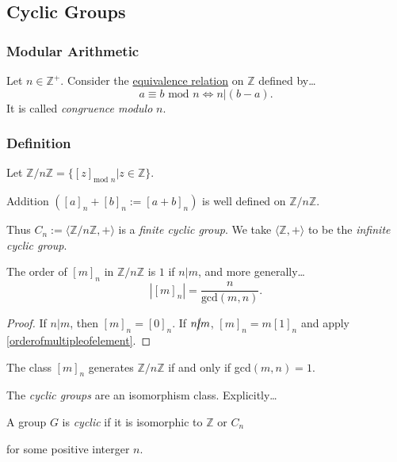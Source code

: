 \subsection{Cyclic Groups}\label{cyclicgroups}

\subsubsection{Modular Arithmetic}\label{modular arithmetic}
Let $n \in \mathbb{Z}^+$. Consider the \hyperref[equivalencerelation]{equivalence relation} on $\mathbb{Z}$ defined by\dots
$$a \equiv b \textrm{ mod } n \Leftrightarrow n | (b-a).$$
It is called \emph{congruence modulo} $n$.

\subsubsection{Definition}
Let $\mathbb{Z} / n \mathbb{Z} = \{[z]_{\textrm{mod } n} | z \in \mathbb{Z} \}.$

\begin{lemma}
Addition $([a]_n + [b]_n := [a+b]_n)$ is well defined on $\mathbb{Z} / n \mathbb{Z}$.
\end{lemma}

\noindent Thus $C_n := \langle \mathbb{Z} / n \mathbb{Z}, + \rangle$ is a \emph{finite cyclic group}. We take $\langle \mathbb{Z},+ \rangle$ to be the \emph{infinite cyclic group}.

\begin{proposition}
The order of $[m]_n$ in $\mathbb{Z} / n \mathbb{Z}$ is $1$ if $n | m$, and more generally\dots
$$|[m]_n| = \frac{n}{\textrm{gcd}(m,n)}.$$
\end{proposition}

\begin{proof}
If $n | m$, then $[m]_n = [0]_n$. If $n \cancel{|} m$, $[m]_n = m[1]_n$ and apply \ref{orderofmultipleofelement}.
\end{proof}

\begin{corollary}
The class $[m]_n$ generates $\mathbb{Z} / n \mathbb{Z}$ if and only if gcd$(m,n) = 1$.
\end{corollary}

\noindent The \emph{cyclic groups} are an isomorphism class. Explicitly\dots
\begin{center}
A group $G$ is \emph{cyclic} if it is isomorphic to $\mathbb{Z}$ or $C_n$

for some positive interger $n$.
\end{center}

